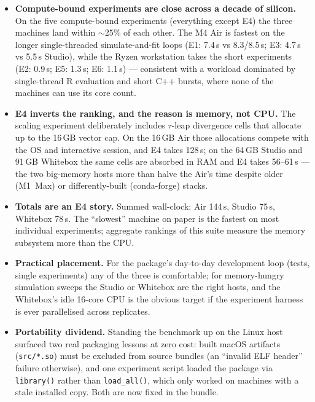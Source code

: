 \documentclass[11pt]{article}
\begin{document}
\begin{itemize}\itemsep3pt
  \item \textbf{Compute-bound experiments are close across a decade of
        silicon.} On the five compute-bound experiments (everything except
        E4) the three machines land within $\sim$25\% of each other. The M4
        Air is fastest on the longer single-threaded simulate-and-fit loops
        (E1: 7.4\,s vs 8.3/8.5\,s; E3: 4.7\,s vs 5.5\,s Studio), while the
        Ryzen workstation takes the short experiments (E2: 0.9\,s; E5:
        1.3\,s; E6: 1.1\,s) — consistent with a workload dominated by
        single-thread R evaluation and short C++ bursts, where none of the
        machines can use its core count.
  \item \textbf{E4 inverts the ranking, and the reason is memory, not
        CPU.} The scaling experiment deliberately includes $\tau$-leap
        divergence cells that allocate up to the 16\,GB vector cap. On the
        16\,GB Air those allocations compete with the OS and interactive
        session, and E4 takes 128\,s; on the 64\,GB Studio and 91\,GB
        Whitebox the same cells are absorbed in RAM and E4 takes 56--61\,s
        — the two big-memory hosts more than halve the Air's time despite
        older (M1~Max) or differently-built (conda-forge) stacks.
  \item \textbf{Totals are an E4 story.} Summed wall-clock: Air 144\,s,
        Studio 75\,s, Whitebox 78\,s. The ``slowest'' machine on paper is
        the fastest on most individual experiments; aggregate rankings of
        this suite measure the memory subsystem more than the CPU.
  \item \textbf{Practical placement.} For the package's day-to-day
        development loop (tests, single experiments) any of the three is
        comfortable; for memory-hungry simulation sweeps the Studio or
        Whitebox are the right hosts, and the Whitebox's idle 16-core CPU
        is the obvious target if the experiment harness is ever
        parallelised across replicates.
  \item \textbf{Portability dividend.} Standing the benchmark up on the
        Linux host surfaced two real packaging lessons at zero cost: built
        macOS artifacts (\texttt{src/*.so}) must be excluded from
        source bundles (an ``invalid ELF header'' failure otherwise), and
        one experiment script loaded the package via \texttt{library()}
        rather than \texttt{load\_all()}, which only worked on machines
        with a stale installed copy. Both are now fixed in the bundle.
\end{itemize}
\end{document}
